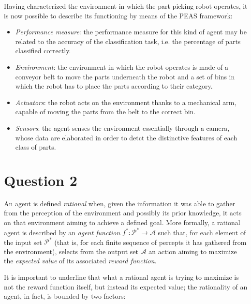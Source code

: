 \documentclass[letterpaper,headings=standardclasses]{scrartcl}
\begin{document}
Having characterized the environment in which the part-picking robot operates, it is now possible to describe its functioning by means of the PEAS framework:

\begin{itemize}

\item \emph{Performance measure}: the performance measure for this kind of agent may be related to the accuracy of the classification task, i.e. the percentage of parts classified correctly.

\item \emph{Environment}: the environment in which the robot operates is made of a conveyor belt to move the parts underneath the robot and a set of bins in which the robot has to place the parts according to their category.

\item \emph{Actuators}: the robot acts on the environment thanks to a mechanical arm, capable of moving the parts from the belt to the correct bin.

\item \emph{Sensors}: the agent senses the environment essentially through a camera, whose data are elaborated in order to detct the distinctive features of each class of parts.

\end{itemize}

\section{Question 2}

An agent is defined \emph{rational} when, given the information it was able to gather from the perception of the environment and possibly its prior knowledge, it acts on that environment aiming to achieve a defined goal. More formally, a rational agent is described by an \emph{agent function} $ f^* : \mathcal{P}^* \rightarrow \mathcal{A} $ such that, for each element of the input set $ \mathcal{P}^* $ (that is, for each finite sequence of percepts it has gathered from the environment), selects from the output set $ \mathcal{A} $ an action aiming to maximize the \emph{expected value} of its associated \emph{reward function}.

It is important to underline that what a rational agent is trying to maximize is not the reward function itself, but instead its expected value; the rationality of an agent, in fact, is bounded by two factors:
\end{document}
